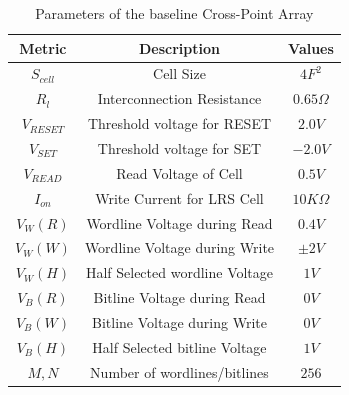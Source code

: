 \begin{table}[!b]
  \centering
  \scriptsize
    \scriptsize
  \caption{Parameters of the baseline Cross-Point Array}\label{table:parameter}
  \vspace{-5pt}
  \begin{tabular}{c|c|c}
    \hline    \hline
    \textbf{Metric} & \textbf{Description} & \textbf{Values} \\
    \hline
    \textbf{$S_{cell}$} & Cell Size & \textbf{$4F^2$} \\
    \textbf{$R_l$} &  Interconnection Resistance&\textbf{$0.65\Omega$} \\
    \textbf{$V_{RESET}$} & Threshold voltage for RESET&\textbf{$2.0V$} \\
    \textbf{$V_{SET}$} & Threshold voltage for SET&\textbf{$-2.0V$} \\
    \textbf{$V_{READ}$} & Read Voltage of Cell&\textbf{$0.5V$} \\
    \textbf{$I_{on}$} & Write Current for LRS Cell &\textbf{$10K\Omega$} \\
    \textbf{$V_{W}(R)$} & Wordline Voltage during Read &\textbf{$0.4V$} \\
    \textbf{$V_{W}(W)$} & Wordline Voltage during Write  &\textbf{$\pm2V$} \\
    \textbf{$V_{W}(H)$} & Half Selected wordline Voltage &\textbf{$1V$} \\
    \textbf{$V_{B}(R)$} & Bitline Voltage during Read  &\textbf{$0V$} \\
    \textbf{$V_{B}(W)$} & Bitline Voltage during Write  &\textbf{$0V$} \\
    \textbf{$V_{B}(H)$} & Half Selected bitline Voltage &\textbf{$1V$} \\
    \textbf{$M,N$} & Number of wordlines/bitlines &\textbf{$256$} \\
    \hline
  \end{tabular}
  \vspace{-10pt}
\end{table}

